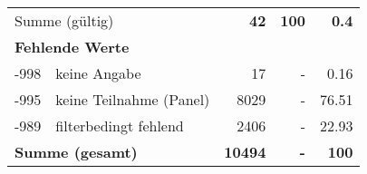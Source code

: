 \begin{longtable}{lXrrr}
     \midrule
     \multicolumn{2}{l}{Summe (gültig)} &
       \textbf{\num{42}} &
     \textbf{\num{100}} &
       \textbf{\num[round-mode=places,round-precision=2]{0.4}} \\
     \multicolumn{5}{l}{\textbf{Fehlende Werte}}\\
       -998 &
       keine Angabe &
         \num{17} &
        - &
         \num[round-mode=places,round-precision=2]{0.16} \\
       -995 &
       keine Teilnahme (Panel) &
         \num{8029} &
        - &
         \num[round-mode=places,round-precision=2]{76.51} \\
       -989 &
       filterbedingt fehlend &
         \num{2406} &
        - &
         \num[round-mode=places,round-precision=2]{22.93} \\
     \midrule
     \multicolumn{2}{l}{\textbf{Summe (gesamt)}} &
          \textbf{\num{10494}} &
        \textbf{-} &
        \textbf{\num{100}} \\
     \bottomrule
     \end{longtable}
     
